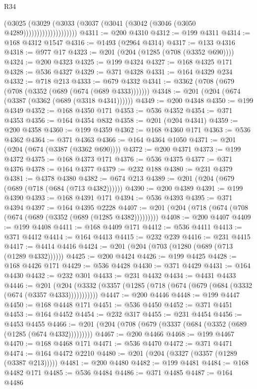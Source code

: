 \begin{lexlean}{R34}
\begin{coremodule}
                            (@3025
                              (@3029
                                (@3033 (@3037 (@3041 (@3042 (@3046 (@3050 @4289))))))))))))))))))))
@4311 := @200 @4310
@4312 := @199 @4311
@4314 := @168 @4312 @1547
@4316 := @1493 (@2964 @4314)
@4317 := @133 @4316
@4318 := @977 @17
@4323 := @201 (@204 (@1285 (@708 (@3352 @690))))
@4324 := @200 @4323
@4325 := @199 @4324
@4327 := @168 @4325 @171
@4328 := @536 @4327
@4329 := @371 @4328
@4331 := @164 @4329 @234
@4332 := @718 @213
@4333 := @679 @4332
@4341 := @3362 (@708 (@679 (@708 (@3352 (@689 (@674 (@689 @4333)))))))
@4348 := @201 (@204 (@674 (@3387 (@3362 (@689 (@3318 @4341))))))
@4349 := @200 @4348
@4350 := @199 @4349
@4352 := @168 @4350 @171
@4353 := @536 @4352
@4354 := @371 @4353
@4356 := @164 @4354 @832
@4358 := @201 (@204 @4341)
@4359 := @200 @4358
@4360 := @199 @4359
@4362 := @168 @4360 @171
@4363 := @536 @4362
@4364 := @371 @4363
@4366 := @164 @4364 @1050
@4371 := @201 (@204 (@674 (@3387 (@3362 @690))))
@4372 := @200 @4371
@4373 := @199 @4372
@4375 := @168 @4373 @171
@4376 := @536 @4375
@4377 := @371 @4376
@4378 := @164 @4377
@4379 := @232 @188
@4380 := @231 @4379
@4381 := @4378 @4380
@4382 := @674 @213
@4389 := @201 (@204 (@679 (@689 (@718 (@684 (@713 @4382))))))
@4390 := @200 @4389
@4391 := @199 @4390
@4393 := @168 @4391 @171
@4394 := @536 @4393
@4395 := @371 @4394
@4397 := @164 @4395 @2228
@4407 := @201 (@204 (@718 (@674 (@708 (@674 (@689 (@3352 (@689 (@1285 @4382)))))))))
@4408 := @200 @4407
@4409 := @199 @4408
@4411 := @168 @4409 @171
@4412 := @536 @4411
@4413 := @371 @4412
@4414 := @164 @4413
@4415 := @232 @239
@4416 := @231 @4415
@4417 := @4414 @4416
@4424 := @201 (@204 (@703 (@1280 (@689 (@713 (@1289 @4332))))))
@4425 := @200 @4424
@4426 := @199 @4425
@4428 := @168 @4426 @171
@4429 := @536 @4428
@4430 := @371 @4429
@4431 := @164 @4430
@4432 := @232 @301
@4433 := @231 @4432
@4434 := @4431 @4433
@4446 := @201
    (@204 (@3332 (@3357 (@1285 (@718 (@674 (@679 (@684 (@3332 (@674 (@3357 @4333)))))))))))
@4447 := @200 @4446
@4448 := @199 @4447
@4450 := @168 @4448 @171
@4451 := @536 @4450
@4452 := @371 @4451
@4453 := @164 @4452
@4454 := @232 @317
@4455 := @231 @4454
@4456 := @4453 @4455
@4466 := @201 (@204 (@708 (@679 (@3337 (@684 (@3352 (@689 (@1285 (@674 @4332)))))))))
@4467 := @200 @4466
@4468 := @199 @4467
@4470 := @168 @4468 @171
@4471 := @536 @4470
@4472 := @371 @4471
@4474 := @164 @4472 @2210
@4480 := @201 (@204 (@3327 (@3357 (@1289 (@3387 @213)))))
@4481 := @200 @4480
@4482 := @199 @4481
@4484 := @168 @4482 @171
@4485 := @536 @4484
@4486 := @371 @4485
@4487 := @164 @4486

\end{coremodule}
\end{lexlean}
